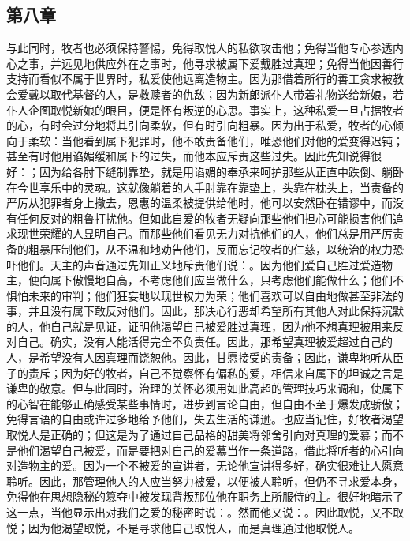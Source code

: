 
\subsection{第八章}

\par

与此同时，牧者也必须保持警惕，免得取悦人的私欲攻击他；免得当他专心参透内心之事，并远见地供应外在之事时，他寻求被属下爱戴胜过真理；免得当他因善行支持而看似不属于世界时，私爱使他远离造物主。因为那借着所行的善工贪求被教会爱戴以取代基督的人，是救赎者的仇敌；因为新郎派仆人带着礼物送给新娘，若仆人企图取悦新娘的眼目，便是怀有叛逆的心思。事实上，这种私爱一旦占据牧者的心，有时会过分地将其引向柔软，但有时引向粗暴。因为出于私爱，牧者的心倾向于柔软：当他看到属下犯罪时，他不敢责备他们，唯恐他们对他的爱变得迟钝；甚至有时他用谄媚缓和属下的过失，而他本应斥责这些过失。因此先知说得很好：；因为给各肘下缝制靠垫，就是用谄媚的奉承来呵护那些从正直中跌倒、躺卧在今世享乐中的灵魂。这就像躺着的人手肘靠在靠垫上，头靠在枕头上，当责备的严厉从犯罪者身上撤去，恩惠的温柔被提供给他时，他可以安然卧在错谬中，而没有任何反对的粗鲁打扰他。但如此自爱的牧者无疑向那些他们担心可能损害他们追求现世荣耀的人显明自己。而那些他们看见无力对抗他们的人，他们总是用严厉责备的粗暴压制他们，从不温和地劝告他们，反而忘记牧者的仁慈，以统治的权力恐吓他们。天主的声音通过先知正义地斥责他们说：。因为他们爱自己胜过爱造物主，便向属下傲慢地自高，不考虑他们应当做什么，只考虑他们能做什么；他们不惧怕未来的审判；他们狂妄地以现世权力为荣；他们喜欢可以自由地做甚至非法的事，并且没有属下敢反对他们。因此，那决心行恶却希望所有其他人对此保持沉默的人，他自己就是见证，证明他渴望自己被爱胜过真理，因为他不想真理被用来反对自己。确实，没有人能活得完全不负责任。因此，那希望真理被爱超过自己的人，是希望没有人因真理而饶恕他。因此，甘愿接受的责备；因此，谦卑地听从臣子的责斥；因为好的牧者，自己不觉察怀有偏私的爱，相信来自属下的坦诚之言是谦卑的敬意。但与此同时，治理的关怀必须用如此高超的管理技巧来调和，使属下的心智在能够正确感受某些事情时，进步到言论自由，但自由不至于爆发成骄傲；免得言语的自由或许过多地给予他们，失去生活的谦逊。也应当记住，好牧者渴望取悦人是正确的；但这是为了通过自己品格的甜美将邻舍引向对真理的爱慕；而不是他们渴望自己被爱，而是要把对自己的爱慕当作一条道路，借此将听者的心引向对造物主的爱。因为一个不被爱的宣讲者，无论他宣讲得多好，确实很难让人愿意聆听。因此，那管理他人的人应当努力被爱，以便被人聆听，但仍不寻求爱本身，免得他在思想隐秘的篡夺中被发现背叛那位他在职务上所服侍的主。很好地暗示了这一点，当他显示出对我们之爱的秘密时说：。然而他又说：。因此取悦，又不取悦；因为他渴望取悦，不是寻求他自己取悦人，而是真理通过他取悦人。\par

